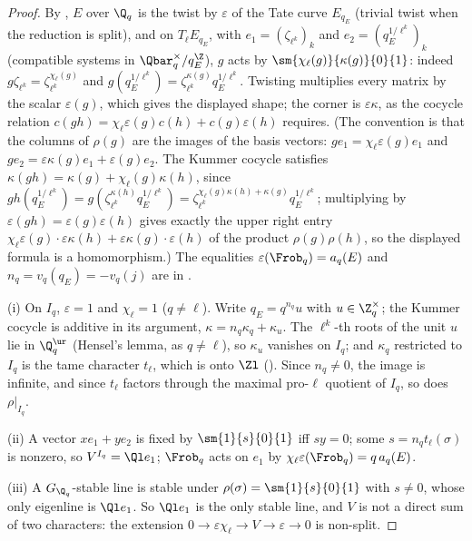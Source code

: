 \begin{proof}
By , $E$ over $\Q_q$ is the twist by $\varepsilon$ of the Tate curve $E_{q_E}$ (trivial twist when the reduction is split), and on
$T_\ell E_{q_E}$, with $e_1=(\zeta_{\ell^k})_k$ and $e_2=(q_E^{1/\ell^k})_k$ (compatible systems in $\Qbar_q^\times/q_E^{\Z}$), $g$ acts by $\sm{\chi_\ell(g)}{\kappa(g)}{0}{1}$: indeed
$g\zeta_{\ell^k}=\zeta_{\ell^k}^{\chi_\ell(g)}$ and $g(q_E^{1/\ell^k})=\zeta_{\ell^k}^{\kappa(g)}q_E^{1/\ell^k}$. Twisting multiplies every matrix by the scalar $\varepsilon(g)$, which gives the
displayed shape; the corner is $\varepsilon\kappa$, as the cocycle relation $c(gh)=\chi_\ell\varepsilon(g)c(h)+c(g)\varepsilon(h)$ requires. (The convention is that the
columns of $\rho(g)$ are the images of the basis vectors: $ge_1=\chi_\ell\varepsilon(g)e_1$ and $ge_2=\varepsilon\kappa(g)e_1+\varepsilon(g)e_2$. The Kummer cocycle satisfies
$\kappa(gh)=\kappa(g)+\chi_\ell(g)\kappa(h)$, since $gh(q_E^{1/\ell^k})=g(\zeta_{\ell^k}^{\kappa(h)}q_E^{1/\ell^k})=\zeta_{\ell^k}^{\chi_\ell(g)\kappa(h)+\kappa(g)}q_E^{1/\ell^k}$; multiplying by
$\varepsilon(gh)=\varepsilon(g)\varepsilon(h)$ gives exactly the upper right entry $\chi_\ell\varepsilon(g)\cdot\varepsilon\kappa(h)+\varepsilon\kappa(g)\cdot\varepsilon(h)$ of the product
$\rho(g)\rho(h)$, so the displayed formula is a homomorphism.) The equalities $\varepsilon(\Frob_q)=a_q(E)$ and
$n_q=v_q(q_E)=-v_q(j)$ are in .

(i) On $I_q$, $\varepsilon=1$ and $\chi_\ell=1$ ($q\ne\ell$). Write $q_E=q^{n_q}u$ with $u\in\Z_q^\times$; the Kummer cocycle is additive in its argument,
$\kappa=n_q\kappa_q+\kappa_u$. The $\ell^k$-th roots of the unit $u$ lie in $\Q_q^{\ur}$ (Hensel's lemma, as $q\ne\ell$), so $\kappa_u$ vanishes on $I_q$; and $\kappa_q$
restricted to $I_q$ is the tame character $t_\ell$, which is onto $\Zl$ (). Since $n_q\ne0$, the image is infinite, and since $t_\ell$
factors through the maximal pro-$\ell$ quotient of $I_q$, so does $\rho|_{I_q}$.

(ii) A vector $xe_1+ye_2$ is fixed by $\sm{1}{s}{0}{1}$ iff $sy=0$; some $s=n_qt_\ell(\sigma)$ is nonzero, so $V^{I_q}=\Ql e_1$; $\Frob_q$ acts on $e_1$ by
$\chi_\ell\varepsilon(\Frob_q)=q\,a_q(E)$.

(iii) A $G_{\Q_q}$-stable line is stable under $\rho(\sigma)=\sm{1}{s}{0}{1}$ with $s\ne0$, whose only eigenline is $\Ql e_1$. So $\Ql e_1$ is the only stable
line, and $V$ is not a direct sum of two characters: the extension $0\to\varepsilon\chi_\ell\to V\to\varepsilon\to0$ is non-split.


\end{proof}
